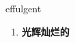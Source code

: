 
\begin{frame}
{\huge effulgent}
\begin{center}
\begin{enumerate}\Large
  \item \textbf{光辉灿烂的}
\end{enumerate}
\end{center}
\end{frame}
